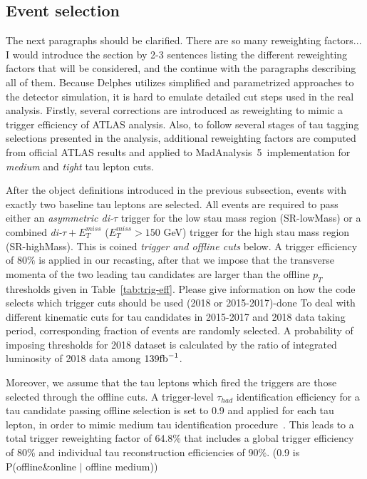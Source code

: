 \documentclass{ws-mpla}
\newcommand{\madanalysis}{{\sc MadAnalysis~5}}
\begin{document}
\subsection{Event selection}\label{sec:selection}
{\color{red}The next paragraphs should be clarified. There are so many reweighting factors... I would introduce the section by 2-3 sentences listing the different reweighting factors that will be considered, and the continue with the paragraphs describing all of them.}
{\color{blue} Because {\sc Delphes} utilizes simplified and parametrized approaches to the detector simulation, it is hard to emulate detailed cut steps used in the real analysis. Firstly, several corrections are introduced as reweighting to mimic a trigger efficiency of ATLAS analysis. Also, to follow several stages of tau tagging selections presented in the analysis, additional reweighting factors are computed from official ATLAS results and applied to \madanalysis\ implementation for \textit{medium} and \textit{tight} tau lepton cuts.}

After the object definitions introduced in the previous subsection, events with exactly two baseline tau leptons are selected.
All events are required to pass either an \textit{asymmetric di-$\tau$} trigger for the low stau mass region (SR-lowMass) or a combined \textit{di-$\tau +E^{miss}_T$} ($E^{miss}_T > 150$ GeV) trigger for the high stau mass region (SR-highMass). This is coined \textit{trigger and offline cuts} below.
A trigger efficiency of $80\%$ is applied in our recasting, after that we impose that the transverse momenta of the two leading tau candidates are larger than the offline $p_T$ thresholds given in Table~\ref{tab:trig-eff}.
{\color{red}Please give information on how the code selects which trigger cuts should be used (2018 or 2015-2017)-done}
{\color{blue} To deal with different kinematic cuts for tau candidates in 2015-2017 and 2018 data taking period, corresponding fraction of events are randomly selected. A probability of imposing thresholds for 2018 dataset is calculated by the ratio of integrated luminosity of 2018 data among $139 {\rm fb}^{-1}$.}

Moreover, we assume that the tau leptons which fired the triggers are those selected through the offline cuts. A trigger-level $\tau_{had}$ identification efficiency {\color{blue}for a tau candidate passing offline selection is set to 0.9 and applied for each tau lepton, in order to mimic medium tau identification procedure}~\cite{ATLAS:2017mpa}.
This leads to a total trigger reweighting factor of 64.8\% that includes a global trigger efficiency of 80\% and individual tau reconstruction efficiencies of 90\%.
{\color{blue}(0.9 is P(offline\&online $\vert$ offline medium))}
\end{document}
